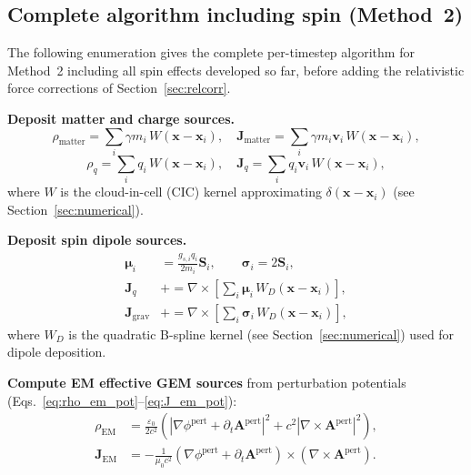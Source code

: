 \documentclass[11pt,a4paper]{article}
\newcommand{\vv}[1]{\mathbf{#1}}
\begin{document}
\subsection{Complete algorithm including spin (Method~2)}
\label{sec:alg_spin}

The following enumeration gives the complete per-timestep algorithm for Method~2 including all spin effects developed so far, before adding the relativistic force corrections of Section~\ref{sec:relcorr}.

\begin{algsteps}
  \item \textbf{Deposit matter and charge sources.}
  \begin{equation}
    \rho_{\mathrm{matter}} = \sum_i \gamma m_i\,W(\vv{x}-\vv{x}_i), \quad
    \vv{J}_{\mathrm{matter}} = \sum_i \gamma m_i\vv{v}_i\,W(\vv{x}-\vv{x}_i),
  \end{equation}
  \begin{equation}
    \rho_q = \sum_i q_i\,W(\vv{x}-\vv{x}_i), \quad
    \vv{J}_q = \sum_i q_i\vv{v}_i\,W(\vv{x}-\vv{x}_i),
  \end{equation}
  where $W$ is the cloud-in-cell (CIC) kernel approximating $\delta(\vv{x}-\vv{x}_i)$ (see Section~\ref{sec:numerical}).

  \item \textbf{Deposit spin dipole sources.}
  \begin{align}
    \boldsymbol{\mu}_i   &= \frac{g_{s,i} q_i}{2m_i}\vv{S}_i, \qquad
    \boldsymbol{\sigma}_i = 2\vv{S}_i, \\
    \vv{J}_q             &\mathrel{+}= \nabla\times\!\left[\sum_i \boldsymbol{\mu}_i\,W_D(\vv{x}-\vv{x}_i)\right], \\
    \vv{J}_{\mathrm{grav}} &\mathrel{+}= \nabla\times\!\left[\sum_i \boldsymbol{\sigma}_i\,W_D(\vv{x}-\vv{x}_i)\right],
  \end{align}
  where $W_D$ is the quadratic B-spline kernel (see Section~\ref{sec:numerical}) used for dipole deposition.

  \item \textbf{Compute EM effective GEM sources} from perturbation potentials (Eqs.~\ref{eq:rho_em_pot}--\ref{eq:J_em_pot}):
  \begin{align}
    \rho_{\mathrm{EM}} &= \frac{\varepsilon_0}{2c^2}\!\left(|\nabla\phi^{\mathrm{pert}} + \partial_t\vv{A}^{\mathrm{pert}}|^2
      + c^2|\nabla\times\vv{A}^{\mathrm{pert}}|^2\right), \\
    \vv{J}_{\mathrm{EM}} &= -\frac{1}{\mu_0 c^2}\!\left(\nabla\phi^{\mathrm{pert}} + \partial_t\vv{A}^{\mathrm{pert}}\right)
      \times\!\left(\nabla\times\vv{A}^{\mathrm{pert}}\right).
  \end{align}


\end{algsteps}
\end{document}
